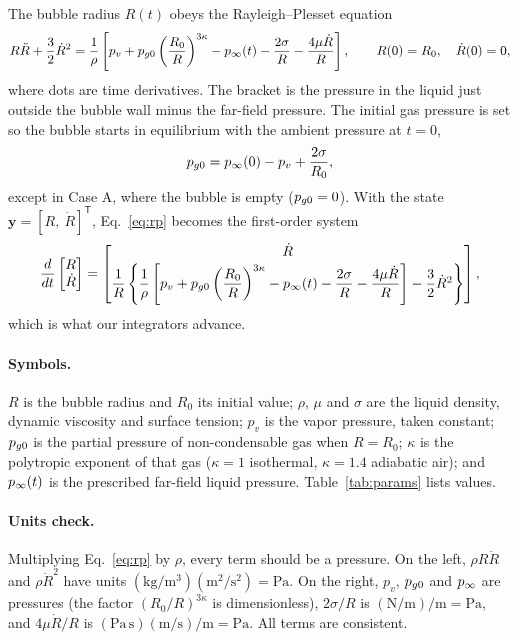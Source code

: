 The bubble radius $R(t)$ obeys the Rayleigh--Plesset equation
\cite{plesset1949,brennen1995,plesset1977}
\begin{equation}\label{eq:rp}
  R\ddot R + \frac{3}{2}\dot R^2
  = \frac{1}{\rho}\left[ p_v + p_{g0}\left(\frac{R_0}{R}\right)^{3\kappa}
    - p_\infty(t) - \frac{2\sigma}{R} - \frac{4\mu\dot R}{R} \right],
  \qquad R(0) = R_0,\quad \dot R(0) = 0,
\end{equation}
where dots are time derivatives. The bracket is the pressure in the liquid just outside the
bubble wall minus the far-field pressure. The initial gas pressure is set so the bubble
starts in equilibrium with the ambient pressure at $t = 0$,
\begin{equation}\label{eq:pg0}
  p_{g0} = p_\infty(0) - p_v + \frac{2\sigma}{R_0},
\end{equation}
except in Case A, where the bubble is empty ($p_{g0} = 0$). With the state
$\mathbf{y} = [R,\ \dot R]^{\mathsf T}$, Eq.~\eqref{eq:rp} becomes the first-order system
\begin{equation}\label{eq:system}
  \frac{d}{dt}\begin{bmatrix} R \\ \dot R \end{bmatrix}
  = \begin{bmatrix}
      \dot R \\[2pt]
      \dfrac{1}{R}\left\{ \dfrac{1}{\rho}\left[ p_v + p_{g0}\left(\dfrac{R_0}{R}\right)^{3\kappa}
      - p_\infty(t) - \dfrac{2\sigma}{R} - \dfrac{4\mu\dot R}{R} \right] - \dfrac{3}{2}\dot R^2 \right\}
    \end{bmatrix},
\end{equation}
which is what our integrators advance.

\paragraph{Symbols.} $R$ is the bubble radius and $R_0$ its initial value; $\rho$, $\mu$ and
$\sigma$ are the liquid density, dynamic viscosity and surface tension; $p_v$ is the vapor
pressure, taken constant; $p_{g0}$ is the partial pressure of non-condensable gas when
$R = R_0$; $\kappa$ is the polytropic exponent of that gas ($\kappa = 1$ isothermal,
$\kappa = 1.4$ adiabatic air); and $p_\infty(t)$ is the prescribed far-field liquid pressure.
Table~\ref{tab:params} lists values.

\paragraph{Units check.} Multiplying Eq.~\eqref{eq:rp} by $\rho$, every term should be a
pressure. On the left, $\rho R\ddot R$ and $\rho\dot R^2$ have units
$(\mathrm{kg/m^3})(\mathrm{m^2/s^2}) = \mathrm{Pa}$. On the right, $p_v$, $p_{g0}$ and
$p_\infty$ are pressures (the factor $(R_0/R)^{3\kappa}$ is dimensionless),
$2\sigma/R$ is $(\mathrm{N/m})/\mathrm{m} = \mathrm{Pa}$, and $4\mu\dot R/R$ is
$(\mathrm{Pa\,s})(\mathrm{m/s})/\mathrm{m} = \mathrm{Pa}$. All terms are consistent.

